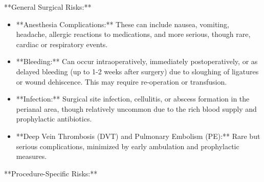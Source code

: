 **General Surgical Risks:**

\begin{itemize}
  \item **Anesthesia Complications:** These can include nausea, vomiting, headache, allergic reactions to medications, and more serious, though rare, cardiac or respiratory events.
  
  \item **Bleeding:** Can occur intraoperatively, immediately postoperatively, or as delayed bleeding (up to 1-2 weeks after surgery) due to sloughing of ligatures or wound dehiscence. This may require re-operation or transfusion.
  
  \item **Infection:** Surgical site infection, cellulitis, or abscess formation in the perianal area, though relatively uncommon due to the rich blood supply and prophylactic antibiotics.
  
  \item **Deep Vein Thrombosis (DVT) and Pulmonary Embolism (PE):** Rare but serious complications, minimized by early ambulation and prophylactic measures.
\end{itemize}

**Procedure-Specific Risks:**

